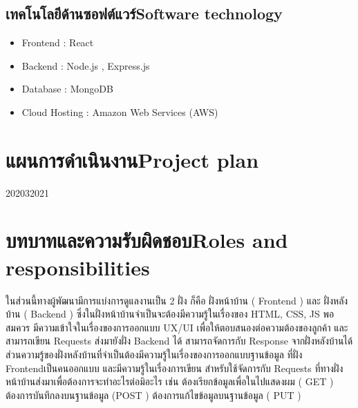 \subsection{\ifcpe เทคโนโลยีด้านซอฟต์แวร์\else Software technology\fi}
\begin{itemize}
    \item Frontend : React 	
    \item Backend : Node.js , Express.js 
    \item Database : MongoDB
    \item Cloud Hosting : Amazon Web Services (AWS)
\end{itemize}



\section{\ifcpe แผนการดำเนินงาน\else Project plan\fi}

\begin{plan}{6}{2020}{3}{2021}




\end{plan}


\section{\ifcpe บทบาทและความรับผิดชอบ\else Roles and responsibilities\fi}
ในส่วนนี้ทางผู้พัฒนามีการแบ่งการดูแลงานเป็น 2 ฝั่ง ก็คือ ฝั่งหน้าบ้าน 
( Frontend ) และ ฝั่งหลังบ้าน ( Backend ) ซึ่งในฝั่งหน้าบ้านจำเป็นจะต้องมีความรู้ในเรื่องของ HTML, CSS, JS พอสมควร มีความเข้าใจในเรื่องของการออกแบบ UX/UI เพื่อให้ตอบสนองต่อความต้องของลูกค้า และสามารถเขียน Requests ส่งมายังฝั่ง Backend ได้ สามารถจัดการกับ Response จากฝั่งหลังบ้านได้ ส่วนความรู้ของฝั่งหลังบ้านที่จำเป็นต้องมีความรู้ในเรื่องของการออกแบบฐานข้อมูล ที่ฝั่ง Frontendเป็นคนออกแบบ และมีความรู้ในเรื่องการเขียน  สำหรับใช้จัดการกับ Requests ที่ทางฝั่งหน้าบ้านส่งมาเพื่อต้องการจะทำอะไรต่อมิอะไร เช่น ต้องเรียกข้อมูลเพื่อในไปแสดงผม ( GET )
ต้องการบันทึกลงบนฐานข้อมูล (POST ) ต้องการแก้ไขข้อมูลบนฐานข้อมูล ( PUT )

